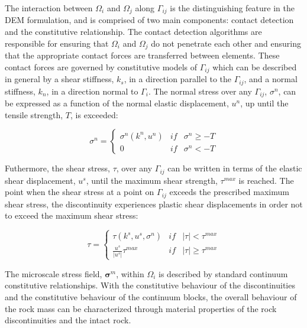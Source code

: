 The interaction between $\Omega_i$ and $\Omega_j$ along $\Gamma_{ij}$ is the distinguishing feature in the DEM formulation, and is comprised of two main components: contact detection and the constitutive relationship. The contact detection algorithms are responsible for ensuring that $\Omega_i$ and $\Omega_j$ do not penetrate each other and ensuring that the appropriate contact forces are transferred between elements. These contact forces are governed by constitutive models of $\Gamma_{ij}$ which can be described in general by a shear stiffness, $k_s$, in a direction parallel to the $\Gamma_{ij}$, and a normal stiffness, $k_n$, in a direction normal to $\Gamma_i$. The normal stress over any $\Gamma_{ij}$, $\sigma^n$, can be expressed as a function of the normal elastic displacement, $u^n$, up until the tensile strength, $T$, is exceeded: 

\begin{equation}
\sigma^n=\left\{\begin{matrix}
\sigma^n\left(k^n, u^n\right) &if& \sigma^n \geq -T\\ 
 0 & if &\sigma^n < -T
\end{matrix}\right.
\label{eqn:demnormal}
\end{equation}

Futhermore, the shear stress, $\tau$, over any $\Gamma_{ij}$ can be written in terms of the elastic shear displacement, $u^s$, until the maximum shear strength, $\tau^{max}$ is reached. The point when the shear stress at a point on $\Gamma_{ij}$ exceeds the prescribed maximum shear stress, the discontinuity experiences plastic shear displacements in order not to exceed the maximum shear stress:

\begin{equation}
\tau=\left\{\begin{matrix}
\tau\left(k^s,u^s, \sigma^n\right) &if&\left |\tau \right | < \tau^{max}\\ 
\frac{u^s}{\left|u^s\right|}\tau^{max} & if &\left |\tau \right | \geq \tau^{max}
\end{matrix}\right.
\label{eqn:demshear}
\end{equation}

The microscale stress field, $\boldsymbol{\sigma}^m$, within $\Omega_i$ is described by standard continuum constitutive relationships. With the constitutive behaviour of the discontinuities and the constitutive behaviour of the continuum blocks, the overall behaviour of the rock mass can be characterized through material properties of the rock discontinuities and the intact rock.

